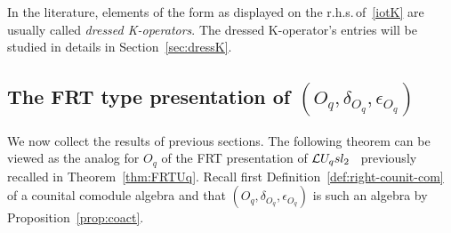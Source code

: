 \documentclass[11pt]{amsart}
\numberwithin{equation}{section}
\numberwithin{equation}{section}
\begin{document}
In the literature, elements of the form as displayed on the r.h.s.\,of~\eqref{iotK} are usually called {\it dressed K-operators}. The dressed K-operator's entries will be studied in details in Section~\ref{sec:dressK}.

\subsection{The FRT type presentation of $(O_q,\delta_{O_q},\epsilon_{O_q})$}
We now collect the results of previous sections. The following theorem can be viewed as the analog for $O_q$ of the FRT presentation of $\mathcal{L} U_q sl_2$~\cite[Def.\,3.2 \& ~eqs.\,(4.8),~(4.9)]{DF93} previously recalled in Theorem~\ref{thm:FRTUq}.
Recall first Definition~\ref{def:right-counit-com} of a counital comodule algebra  and that $(O_q,\delta_{O_q},\epsilon_{O_q})$ is such an algebra by Proposition~\ref{prop:coact}.
\end{document}
